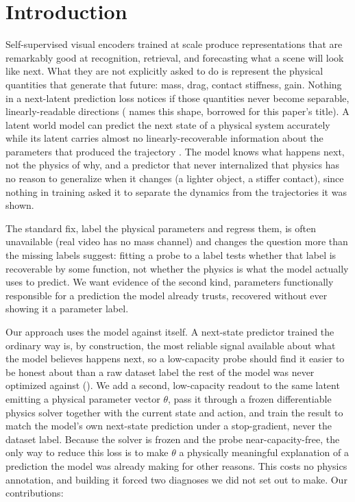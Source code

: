 \section{Introduction}
\label{sec:introduction}

Self-supervised visual encoders trained at scale
\citep{caron2021dino,oquab2023dinov2,assran2023ijepa} produce
representations that are remarkably good at recognition, retrieval, and
forecasting what a scene will look like next. What they are not
explicitly asked to do is represent the physical quantities that
generate that future: mass, drag, contact stiffness, gain. Nothing in a
next-latent prediction loss notices if those quantities never become
separable, linearly-readable directions (\citealt{filling-hierarchy-blog}
names this shape, borrowed for this paper's title). A latent world
model can predict the next state of a physical system accurately while
its latent carries almost no linearly-recoverable information about the
parameters that produced the trajectory
\citep{latent-wm-identifiability}. The model knows what happens next,
not the physics of why, and a predictor that never internalized that
physics has no reason to generalize when it changes (a lighter object,
a stiffer contact), since nothing in training asked it to separate the
dynamics from the trajectories it was shown.

The standard fix, label the physical parameters and regress them, is
often unavailable (real video has no mass channel) and changes the
question more than the missing labels suggest: fitting a probe to a
label tests whether that label is recoverable by some function, not
whether the physics is what the model actually uses to predict. We want
evidence of the second kind, parameters functionally responsible for a
prediction the model already trusts, recovered without ever showing it
a parameter label.



Our approach uses the model against itself. A next-state predictor
trained the ordinary way is, by construction, the most reliable signal
available about what the model believes happens next, so a
low-capacity probe should find it easier to be honest about than a raw
dataset label the rest of the model was never optimized against
(). We add a second, low-capacity readout to the
same latent emitting a physical parameter vector $\theta$, pass it
through a frozen differentiable physics solver together with the
current state and action, and train the result to match the model's
own next-state prediction under a stop-gradient, never the dataset
label. Because the solver is frozen and the probe near-capacity-free,
the only way to reduce this loss is to make $\theta$ a physically
meaningful explanation of a prediction the model was already making for
other reasons. This costs no physics annotation, and building it forced
two diagnoses we did not set out to make. Our contributions:

